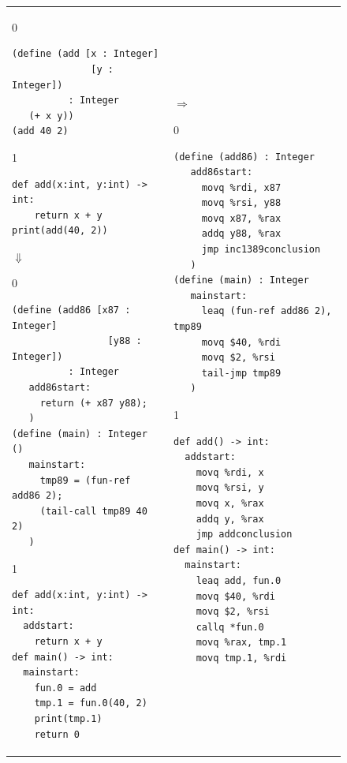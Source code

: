 \documentclass[7x10]{TimesAPriori_MIT}%
\def\racketEd{0}
\def\pythonEd{1}
\providecommand{\BookEdition}{1}
\let\edition\BookEdition
\newcommand{\pythonColor}[0]{}
\numberwithin{theorem}{chapter}
\numberwithin{definition}{chapter}
\numberwithin{equation}{chapter}
\begin{document}
\begin{figure}[hbtp]
  \begin{tcolorbox}[colback=white]
    \begin{tabular}{ll}
\begin{minipage}{0.4\textwidth}
{\if\edition\racketEd
\begin{lstlisting}[basicstyle=\ttfamily\footnotesize]
(define (add [x : Integer]
              [y : Integer])
          : Integer
   (+ x y))
(add 40 2)
\end{lstlisting}
\fi}
{\if\edition\pythonEd\pythonColor
\begin{lstlisting}[basicstyle=\ttfamily\footnotesize]
def add(x:int, y:int) -> int:
    return x + y
print(add(40, 2))
\end{lstlisting}
\fi}
$\Downarrow$
{\if\edition\racketEd
\begin{lstlisting}[basicstyle=\ttfamily\footnotesize]
(define (add86 [x87 : Integer]
                 [y88 : Integer])
          : Integer
   add86start:
     return (+ x87 y88);
   )
(define (main) : Integer ()
   mainstart:
     tmp89 = (fun-ref add86 2);
     (tail-call tmp89 40 2)
   )
\end{lstlisting}
\fi}
{\if\edition\pythonEd\pythonColor
\begin{lstlisting}[basicstyle=\ttfamily\footnotesize]
def add(x:int, y:int) -> int:
  addstart:
    return x + y
def main() -> int:
  mainstart:
    fun.0 = add
    tmp.1 = fun.0(40, 2)
    print(tmp.1)
    return 0
\end{lstlisting}
\fi}
\end{minipage}
&
$\Rightarrow$
\begin{minipage}{0.5\textwidth}
{\if\edition\racketEd
\begin{lstlisting}[basicstyle=\ttfamily\footnotesize]
(define (add86) : Integer
   add86start:
     movq %rdi, x87
     movq %rsi, y88
     movq x87, %rax
     addq y88, %rax
     jmp inc1389conclusion
   )
(define (main) : Integer
   mainstart:
     leaq (fun-ref add86 2), tmp89
     movq $40, %rdi
     movq $2, %rsi
     tail-jmp tmp89
   )
\end{lstlisting}
\fi}
{\if\edition\pythonEd\pythonColor
\begin{lstlisting}[basicstyle=\ttfamily\footnotesize]
def add() -> int:
  addstart:
    movq %rdi, x
    movq %rsi, y
    movq x, %rax
    addq y, %rax
    jmp addconclusion
def main() -> int:
  mainstart:
    leaq add, fun.0
    movq $40, %rdi
    movq $2, %rsi
    callq *fun.0
    movq %rax, tmp.1
    movq tmp.1, %rdi

\end{lstlisting}}
\end{minipage}
\end{tabular}
\end{tcolorbox}
\end{figure}
\end{document}

